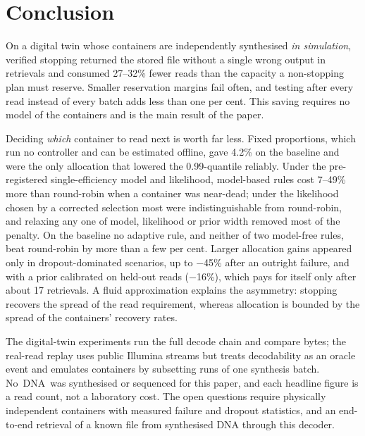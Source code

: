 \documentclass[conference,onecolumn,11pt]{IEEEtran}
\begin{document}
\section{Conclusion}
On a digital twin whose containers are independently synthesised \emph{in simulation}, verified stopping
returned the stored file without a single wrong output in \SafeN{} retrievals and consumed 27--32\% fewer
reads than the capacity a non-stopping plan must reserve.  Smaller reservation margins fail often, and
testing after every read instead of every batch adds less than one per cent.  This saving requires no
model of the containers and is the main result of the paper.

Deciding \emph{which} container to read next is worth far less.  Fixed proportions, which run no
controller and can be estimated offline, gave 4.2\% on the baseline and were the only allocation that
lowered the 0.99-quantile reliably.  Under the pre-registered single-efficiency model and likelihood,
model-based rules cost 7--49\% more than round-robin when a container was near-dead; under the likelihood
chosen by a corrected selection most were indistinguishable from round-robin, and relaxing any one of
model, likelihood or prior width removed most of the penalty.  On the baseline no adaptive rule, and
neither of two model-free rules, beat round-robin by more than a few per cent.  Larger allocation gains
appeared only in dropout-dominated scenarios, up to $-$45\% after an outright failure, and with a prior
calibrated on held-out reads ($-$16\%), which pays for itself only after about 17 retrievals.  A fluid
approximation explains the asymmetry: stopping recovers the spread of the read requirement, whereas
allocation is bounded by the spread of the containers' recovery rates.

The digital-twin experiments run the full decode chain and compare bytes; the real-read replay uses
public Illumina streams but treats decodability as an oracle event and emulates containers by subsetting
runs of one synthesis batch.  No~DNA~was synthesised or sequenced for this paper, and each headline figure
is a read count, not a laboratory cost.  The open questions require physically independent containers with
measured failure and dropout statistics, and an end-to-end retrieval of a known file from synthesised DNA
through this decoder.

\appendices
\end{document}
